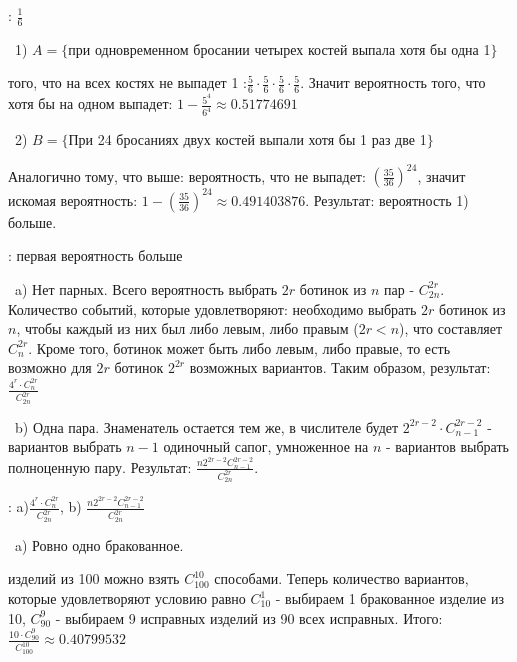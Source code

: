 \bigskip
{}: $\frac{1}{6}$



\noindent~1) $A = \{$при одновременном бросании четырех костей выпала хотя бы одна 1$\}$

 того, что на всех костях не выпадет 1 :$\frac{5}{6} \cdot \frac{5}{6} \cdot \frac{5}{6} \cdot
\frac{5}{6}$. Значит вероятность того, что хотя бы на одном выпадет: $1 - \frac{5^4}{6^4} \approx 0.51774691$

\medskip
\noindent~2) $B = \{$При 24 бросаниях двух костей выпали хотя бы 1 раз две 1$\}$

\noindent Аналогично тому, что выше: вероятность, что не выпадет: $\left(\frac{35}{36}\right)^{24}$,
значит искомая вероятность: $1 - \left(\frac{35}{36}\right)^{24} \approx 0.491403876$. Результат:
вероятность 1) больше.

\bigskip
{}: первая вероятность больше



\noindent~a) Нет парных. Всего вероятность выбрать $2r$ ботинок из $n$ пар - $C_{2n}^{2r}$. 
Количество событий, которые удовлетворяют: необходимо выбрать $2r$ ботинок из $n$, чтобы
каждый из них был либо левым, либо правым ($2r < n$), что составляет $C_n^{2r}$. Кроме того, 
ботинок может быть либо левым, либо правые, то есть возможно для $2r$ ботинок $2^{2r}$ возможных
вариантов. Таким образом, результат:  $\frac{4^r\cdot C_{n}^{2r}}{C_{2n}^{2r}}$

\medskip
\noindent~b) Одна пара. Знаменатель остается тем же, в числителе будет $2^{2r - 2} \cdot C_{n - 1}^{2r - 2}$ - вариантов
выбрать $n - 1$ одиночный сапог, умноженное на $n$ - вариантов выбрать полноценную пару. Результат: 
$\frac{n 2^{2r - 2}C_{n- 1}^{2r - 2}}{C_{2n}^{2r}}$.

\bigskip
{}: a)$\frac{4^r\cdot C_{n}^{2r}}{C_{2n}^{2r}}$, b) $\frac{n 2^{2r - 2}C_{n- 1}^{2r - 2}}{C_{2n}^{2r}}$



\noindent~a) Ровно одно бракованное.

 изделий из 100 можно взять $C_{100}^{10}$ способами. Теперь количество вариантов, 
которые удовлетворяют условию равно $C_{10}^1$ - выбираем 1 бракованное изделие из 10, $C_{90}^{9}$ 
- выбираем 9 исправных изделий из 90 всех исправных. Итого: $\frac{10 \cdot C_{90}^{9}}{C_{100}^{10}}
\approx 0.40799532$

